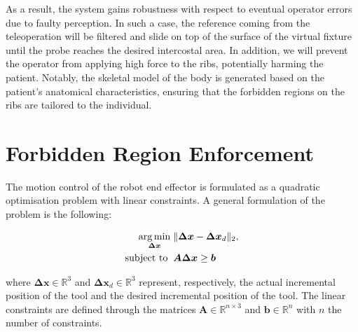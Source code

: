 As a result, the system gains robustness with respect to eventual operator errors due to faulty perception. In such a case, the reference coming from the teleoperation will be filtered and slide on top of the surface of the virtual fixture until the probe reaches the desired intercostal area. 
In addition, we will prevent the operator from applying high force to the ribs, potentially harming the patient.
Notably, the skeletal model of the body is generated based on the patient's anatomical characteristics, ensuring that the forbidden regions on the ribs are tailored to the individual.

\section{Forbidden Region Enforcement}
 The motion control of the robot end effector is formulated as a quadratic optimisation problem with linear constraints. %
A general formulation of the problem is the following:

\begin{equation}
    \begin{aligned}
    \operatorname*{arg\,min}_{\boldsymbol{\Delta x}} \;&\Vert \boldsymbol{\Delta x} - \boldsymbol{\Delta x}_d \Vert_2,\\
    \text{subject to} \;\;&\boldsymbol{A} \boldsymbol{\Delta x} \geq \boldsymbol{b}
\end{aligned}
\label{eq:qp_vf}
\end{equation}

where $\boldsymbol{\Delta x} \in \mathbb{R}^3$ and $\boldsymbol{\Delta x}_d \in \mathbb{R}^3$ represent, respectively, the actual incremental position of the tool and the desired incremental position of the tool. The linear constraints are defined through the matrices $\boldsymbol{A} \in \mathbb{R}^{n \times 3}$ and $\boldsymbol{b} \in \mathbb{R}^n$ with $n$ the number of constraints. 


